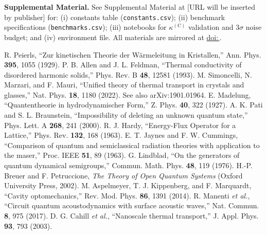\documentclass[aps,prb,preprint,amsmath,amssymb]{revtex4-2} %
\providecommand{\doi}[1]{\href{https://doi.org/#1}{doi:\,#1}}
\begin{document}
        \noindent\textbf{Supplemental Material.}
        See Supplemental Material at [URL will be inserted by publisher] for: (i) constants table (\texttt{constants.csv}); (ii) benchmark specifications (\texttt{benchmarks.csv}); (iii) notebooks for $\kappa^{(\mathrm C)}$ validation and $3\sigma$ noise budget; and (iv) environment file. All materials are mirrored at \doi{\paperdoi}.
        \begin{thebibliography}{99}\setlength{\itemsep}{1pt}
            R. Peierls, ``Zur kinetischen Theorie der Wärmeleitung in Kristallen,'' Ann. Phys. \textbf{395}, 1055 (1929).
            P. B. Allen and J. L. Feldman, ``Thermal conductivity of disordered harmonic solids,'' Phys. Rev. B \textbf{48}, 12581 (1993).
            M. Simoncelli, N. Marzari, and F. Mauri, ``Unified theory of thermal transport in crystals and glasses,'' Nat. Phys. \textbf{18}, 1180 (2022). See also arXiv:1901.01964.
            E. Madelung, ``Quantentheorie in hydrodynamischer Form,'' Z. Phys. \textbf{40}, 322 (1927).
            A. K. Pati and S. L. Braunstein, ``Impossibility of deleting an unknown quantum state,'' Phys. Lett. A \textbf{268}, 241 (2000).
            R. J. Hardy, ``Energy-Flux Operator for a Lattice,'' Phys. Rev. \textbf{132}, 168 (1963).
            E. T. Jaynes and F. W. Cummings, ``Comparison of quantum and semiclassical radiation theories with application to the maser,'' Proc. IEEE \textbf{51}, 89 (1963).
            G. Lindblad, ``On the generators of quantum dynamical semigroups,'' Commun. Math. Phys. \textbf{48}, 119 (1976).
            H.-P. Breuer and F. Petruccione, \textit{The Theory of Open Quantum Systems} (Oxford University Press, 2002).
            M. Aspelmeyer, T. J. Kippenberg, and F. Marquardt, ``Cavity optomechanics,'' Rev. Mod. Phys. \textbf{86}, 1391 (2014).
            R. Manenti \textit{et al.}, ``Circuit quantum acoustodynamics with surface acoustic waves,'' Nat. Commun. \textbf{8}, 975 (2017).
            D. G. Cahill \textit{et al.}, ``Nanoscale thermal transport,'' J. Appl. Phys. \textbf{93}, 793 (2003).

\end{thebibliography}
\end{document}
